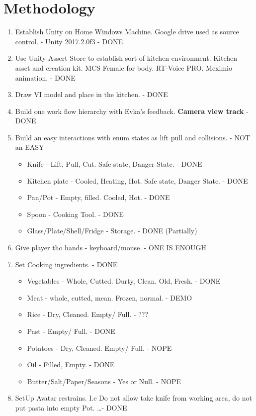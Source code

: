 \documentclass[18pt]{article}
\numberwithin{equation}{section} %
\numberwithin{figure}{section} %
\numberwithin{table}{section} %
\begin{document}
\section{Methodology}	
	\begin{enumerate}
		\item Establish Unity on Home Windows Machine. Google drive used as source control. - Unity 2017.2.0f3 - DONE
		\item Use Unity Assert Store to establish sort of kitchen environment. Kitchen asset and creation kit. MCS Female for body. RT-Voice PRO. Meximio animation.  - DONE
		\item Draw VI model and place in the kitchen.  - DONE
		\item Build one work flow hierarchy with Evka's feedback. \textbf{Camera view track}  - DONE
		\item Build an easy interactions with enum states as lift pull and collisions. - NOT an EASY
		\begin{itemize}
			\item Knife - Lift, Pull, Cut. Safe state, Danger State.  - DONE
			\item Kitchen plate - Cooled, Heating, Hot. Safe state, Danger State.  - DONE
			\item Pan/Pot - Empty, filled. Cooled, Hot.  - DONE
			\item Spoon - Cooking Tool.  - DONE
			\item Glass/Plate/Shell/Fridge - Storage.  - DONE (Partially)
		\end{itemize}
		\item Give player tho hands - keyboard/mouse. - ONE IS ENOUGH
		\item Set Cooking ingredients.  - DONE
		\begin{itemize}
			\item Vegetables - Whole, Cutted. Durty, Clean. Old, Fresh.  - DONE
			\item Meat - whole, cutted, mean. Frozen, normal.  - DEMO
			\item Rice - Dry, Cleaned. Empty/ Full. - ???
			\item Past - Empty/ Full.  - DONE
			\item Potatoes - Dry, Cleaned. Empty/ Full. - NOPE
			\item Oil - Filled, Empty.  - DONE
			\item Butter/Salt/Paper/Seasons - Yes or Null. - NOPE
		\end{itemize}
		\item SetUp Avatar restrains. I.e Do not allow take knife from working area, do not put pasta into empty Pot. \ldots  - DONE	
		
	\end{enumerate}
	
\end{document}
